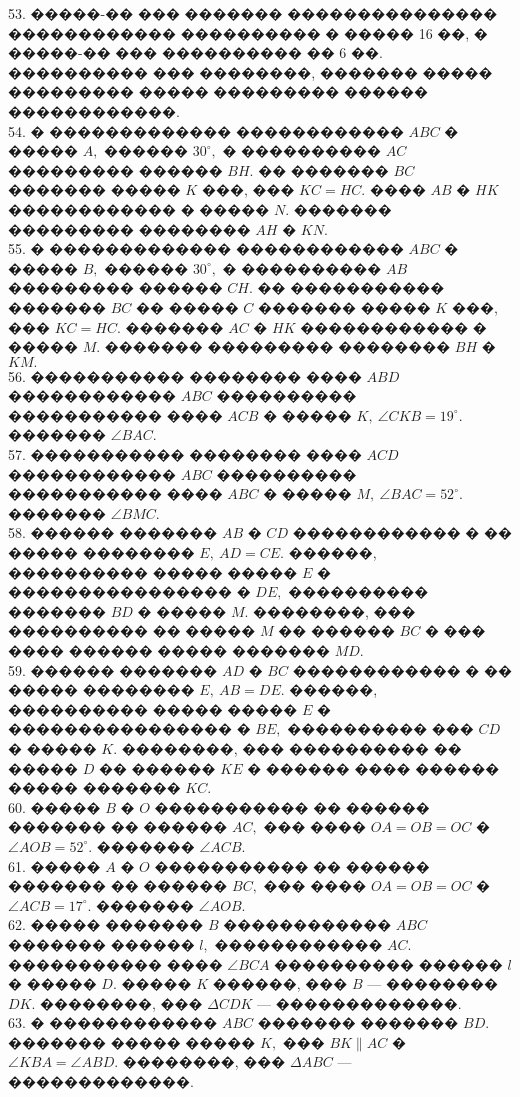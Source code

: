\documentclass[12pt]{article}
\begin{document}
53. �����-�� ��� ������� ��������������� ������������ ���������� � ����� 16 ��, � �����-�� ��� ���������� �� 6 ��. ���������� ��� ��������, ������� ����� ��������� ����� ��������� ������ ������������.\\
54. � ������������� ������������ $ABC$ � ����� $A,$ ������ $30^\circ,$ � ���������� $AC$ ��������� ������ $BH.$ �� ������� $BC$ ������� ����� $K$ ���, ��� $KC=HC.$ ���� $AB$ � $HK$ ������������ � ����� $N.$ ������� ��������� �������� $AH$ � $KN.$\\
55.  � ������������� ������������ $ABC$ � ����� $B,$ ������ $30^\circ,$ � ���������� $AB$ ��������� ������ $CH.$ �� ����������� ������� $BC$ �� ����� $C$ ������� ����� $K$ ���, ��� $KC=HC.$ ������� $AC$ � $HK$ ������������ � ����� $M.$ ������� ��������� �������� $BH$ � $KM.$\\
56. ����������� �������� ���� $ABD$ ������������ $ABC$ ���������� ����������� ���� $ACB$ � ����� $K,\ \angle CKB=19^\circ.$ ������� $\angle BAC.$\\
57. ����������� �������� ���� $ACD$ ������������ $ABC$ ���������� ����������� ���� $ABC$ � ����� $M,\ \angle BAC=52^\circ.$ ������� $\angle BMC.$\\
58. ������ ������� $AB$ � $CD$ ������������ � �� ����� �������� $E,\ AD=CE.$ ������, ���������� ����� ����� $E$ � ���������������� � $DE,$ ���������� ������� $BD$ � ����� $M.$ ��������, ��� ���������� �� ����� $M$ �� ������ $BC$ � ��� ���� ������ ����� ������� $MD.$\\
59. ������ ������� $AD$ � $BC$ ������������ � �� ����� �������� $E,\ AB=DE.$ ������, ���������� ����� ����� $E$ � ���������������� � $BE,$ ���������� ��� $CD$ � ����� $K.$ ��������, ��� ���������� �� ����� $D$ �� ������ $KE$ � ������ ���� ������ ����� ������� $KC.$\\
60. ����� $B$ � $O$ ����������� �� ������ ������� �� ������ $AC,$ ��� ����  $OA=OB=OC$ � $\angle AOB = 52^\circ.$ ������� $\angle ACB.$\\
61. ����� $A$ � $O$ ����������� �� ������ ������� �� ������ $BC,$ ��� ����  $OA=OB=OC$ � $\angle ACB= 17  ^\circ.$ ������� $\angle AOB.$\\
62. ����� ������� $B$ ������������ $ABC$ ������� ������ $l,$ ������������ $AC.$ ����������� ���� $\angle BCA$ ���������� ������ $l$ � ����� $D.$ ����� $K$ ������, ��� $B$ --- �������� $DK.$ ��������, ��� $\Delta CDK$ --- �������������.\\
63. � ������������ $ABC$ ������� ������� $BD.$ ������� ����� ����� $K,$ ��� $BK\parallel AC$ � $\angle KBA=\angle ABD.$ ��������, ��� $\Delta ABC$ --- �������������.\\
\end{document}
